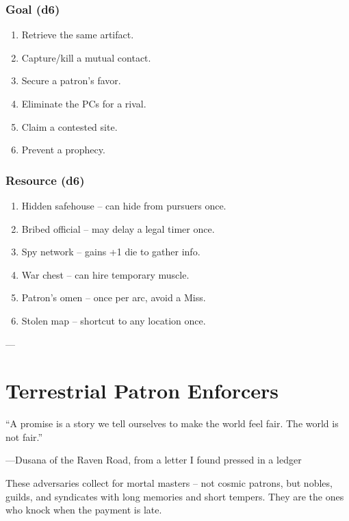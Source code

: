 \subsubsection*{Goal (d6)}
\begin{enumerate}[label=\arabic*.]
    \item Retrieve the same artifact.
    \item Capture/kill a mutual contact.
    \item Secure a patron's favor.
    \item Eliminate the PCs for a rival.
    \item Claim a contested site.
    \item Prevent a prophecy.
\end{enumerate}

\subsubsection*{Resource (d6)}
\begin{enumerate}[label=\arabic*.]
    \item Hidden safehouse -- can hide from pursuers once.
    \item Bribed official -- may delay a legal timer once.
    \item Spy network -- gains +1 die to gather info.
    \item War chest -- can hire temporary muscle.
    \item Patron's omen -- once per arc, avoid a Miss.
    \item Stolen map -- shortcut to any location once.
\end{enumerate}


---

\section*{Terrestrial Patron Enforcers}

\epigraph{``A promise is a story we tell ourselves to make the world feel fair. The world is not fair.''}{---Dusana of the Raven Road, from a letter I found pressed in a ledger}

These adversaries collect for mortal masters -- not cosmic patrons, but nobles, guilds, and syndicates with long memories and short tempers. They are the ones who knock when the payment is late.

